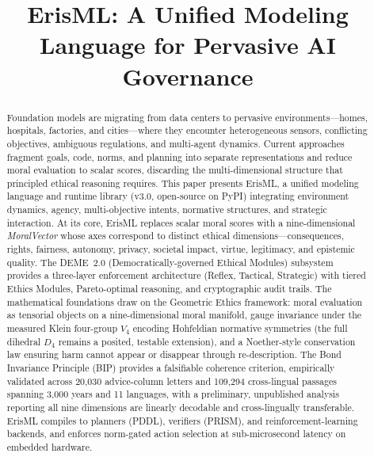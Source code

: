 \documentclass[conference]{IEEEtran}
\begin{document}
\title{ErisML: A Unified Modeling Language for Pervasive AI Governance}

\author{
}

\maketitle
\thispagestyle{empty}

\begin{abstract}
Foundation models are migrating from data centers to pervasive environments---homes, hospitals, factories, and cities---where they encounter heterogeneous sensors, conflicting objectives, ambiguous regulations, and multi-agent dynamics. Current approaches fragment goals, code, norms, and planning into separate representations and reduce moral evaluation to scalar scores, discarding the multi-dimensional structure that principled ethical reasoning requires. This paper presents ErisML, a unified modeling language and runtime library (v3.0, open-source on PyPI) integrating environment dynamics, agency, multi-objective intents, normative structures, and strategic interaction. At its core, ErisML replaces scalar moral scores with a nine-dimensional \emph{MoralVector} whose axes correspond to distinct ethical dimensions---consequences, rights, fairness, autonomy, privacy, societal impact, virtue, legitimacy, and epistemic quality. The DEME~2.0 (Democratically-governed Ethical Modules) subsystem provides a three-layer enforcement architecture (Reflex, Tactical, Strategic) with tiered Ethics Modules, Pareto-optimal reasoning, and cryptographic audit trails. The mathematical foundations draw on the Geometric Ethics framework: moral evaluation as tensorial objects on a nine-dimensional moral manifold, gauge invariance under the measured Klein four-group $V_4$ encoding Hohfeldian normative symmetries (the full dihedral $D_4$ remains a posited, testable extension), and a Noether-style conservation law ensuring harm cannot appear or disappear through re-description. The Bond Invariance Principle (BIP) provides a falsifiable coherence criterion, empirically validated across 20,030 advice-column letters and 109,294 cross-lingual passages spanning 3,000 years and 11 languages, with a preliminary, unpublished analysis reporting all nine dimensions are linearly decodable and cross-lingually transferable. ErisML compiles to planners (PDDL), verifiers (PRISM), and reinforcement-learning backends, and enforces norm-gated action selection at sub-microsecond latency on embedded hardware.
\end{abstract}
\end{document}
